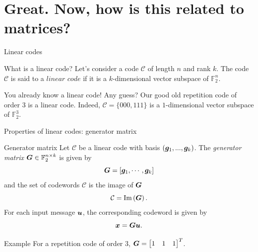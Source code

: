 \documentclass[10pt]{beamer}
\newcommand{\gf}{\mathbb{F}_2}
\newcommand{\im}[1]{\text{Im}\left(#1\right)}
\begin{document}
\section{Great. Now, how is this related to matrices?}
\begin{frame}{Linear codes}
    \begin{block}{What is a linear code?}
        Let's consider a code $\mathcal{C}$ of length $n$ and rank $k$.
        The code $\mathcal{C}$ is said to a $\textit{linear code}$ if it is a
        $k$-dimensional vector subspace of $\gf^n$.
    \end{block}

    \begin{exampleblock}{You already know a linear code! Any guess?}
        \pause
        Our good old repetition code of order 3 is a linear code. Indeed,
        $\mathcal{C} = \{000, 111\}$ is a $1$-dimensional vector subspace of
        $\gf^3$.
    \end{exampleblock}
\end{frame}

\begin{frame}{Properties of linear codes: generator matrix}
    \begin{block}{Generator matrix}
        Let $\mathcal{C}$ be a linear code with basis $(\boldsymbol{g}_1, ..., \boldsymbol{g}_k)$. The
        \textit{generator matrix} $\mG \in \gf^{n\times k}$ is given by
        \[ \boldsymbol{G} = [\boldsymbol{g}_1, \cdots, \boldsymbol{g}_k] \]
        and the set of codewords $\mathcal{C}$ is the image of $\boldsymbol{G}$
        \[\mathcal{C} = \im{\mG}. \]
        For each input message $\boldsymbol{u}$, the corresponding codeword is given by
        \[ \boldsymbol{x} = \boldsymbol{G}\boldsymbol{u}. \]
    \end{block}

    \begin{exampleblock}{Example}
        For a repetition code of order 3, $\boldsymbol{G} = \begin{bmatrix} 1 & 1 & 1\end{bmatrix}^T$.
    \end{exampleblock}
\end{frame}
\end{document}

